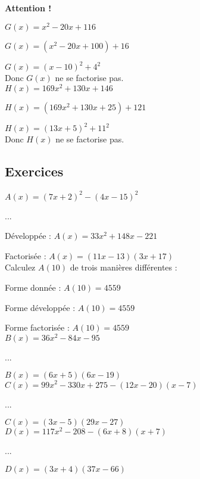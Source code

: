 \textbf{Attention !}

$ G(x) = x^2 - 20x + 116 $

$ G(x) = \left(x^2-20x + 100\right) + 16 $

$ G(x) = \left(x-10\right)^2 + 4^2 $ \\

Donc $ G(x) $ ne se factorise pas. \\

$ H(x) = 169x^2+130x+146 $

$ H(x) = \left(169x^2+130x+25\right)+121 $

$ H(x) = \left(13x+5\right)^2 + 11^2 $ \\

Donc $ H(x) $ ne se factorise pas. \\

\newpage

\subsection{Exercices}

$ A(x) = \left(7x+2\right)^2-\left(4x-15\right)^2 $

...

Développée : $ A(x) = 33x^2 + 148x - 221 $

Factorisée : $ A(x) = \left(11x-13\right)\left(3x+17\right) $ \\

Calculez $ A(10) $ de trois manières différentes :

Forme donnée : $ A(10) = 4559 $

Forme développée : $ A(10) = 4559 $

Forme factorisée : $ A(10) = 4559 $ \\

$ B(x) = 36x^2-84x-95 $

...

$ B(x) = \left(6x+5\right)\left(6x-19\right) $ \\

$ C(x) = 99x^2 - 330x + 275 - \left(12x-20\right)\left(x-7\right) $

...

$ C(x) = \left(3x-5\right)\left(29x-27\right) $ \\

$ D(x) = 117x^2 - 208 - \left(6x+8\right)\left(x+7\right)$ 

...

$ D(x) = \left(3x+4\right)\left(37x-66\right) $


